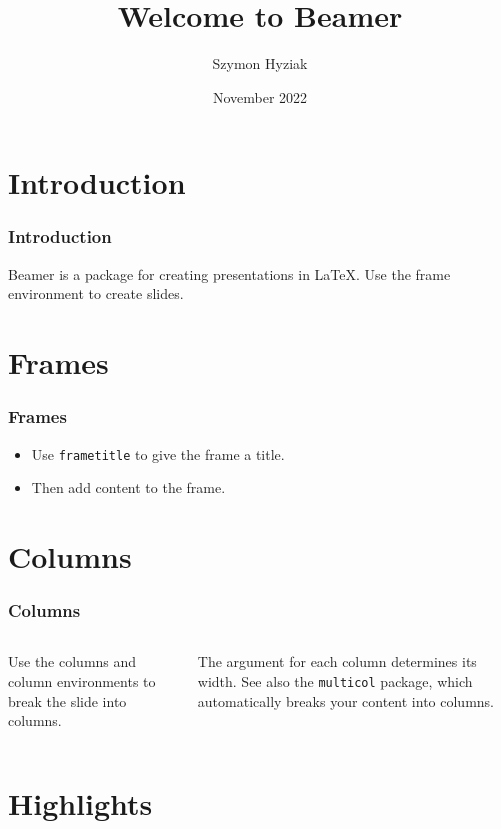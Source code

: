 \documentclass{beamer}
\title{Welcome to Beamer}
\author{Szymon Hyziak}
\date{November 2022}
\begin{document}
\begin{frame}
    \titlepage
\end{frame}

\section{Introduction}


\begin{frame}
    \frametitle{Introduction}
    Beamer is a package for creating presentations in \LaTeX. Use the frame environment to create slides.
\end{frame}

\section{Frames}


\begin{frame}
    \frametitle{Frames}
    \begin{itemize}
        \item Use \texttt{frametitle} to give the frame a title.
        \pause
        \item Then add content to the frame.
    \end{itemize}
\end{frame}

\section{Columns}


\begin{frame}
    \frametitle{Columns}
    \begin{columns}
        \begin{column}{0.5\textwidth}
            Use the columns and column environments to break the slide into columns.
        \end{column}
        \pause 
        \begin{column}{0.5\textwidth}
            The argument for each column determines its width. See also the \texttt{multicol} package, which automatically breaks your content into columns.
        \end{column}
    \end{columns}
\end{frame}

\section{Highlights}

\end{document}
